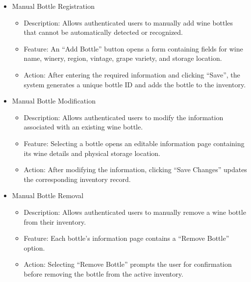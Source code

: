\documentclass[conference]{IEEEtran}
\begin{document}
\begin{itemize}
    \item Manual Bottle Registration
    \begin{itemize}
        \item Description: Allows authenticated users to manually add wine bottles that cannot be automatically detected or recognized.
        \item Feature: An ``Add Bottle'' button opens a form containing fields for wine name, winery, region, vintage, grape variety, and storage location.
        \item Action: After entering the required information and clicking ``Save'', the system generates a unique bottle ID and adds the bottle to the inventory.
    \end{itemize}

    \item Manual Bottle Modification
    \begin{itemize}
        \item Description: Allows authenticated users to modify the information associated with an existing wine bottle.
        \item Feature: Selecting a bottle opens an editable information page containing its wine details and physical storage location.
        \item Action: After modifying the information, clicking ``Save Changes'' updates the corresponding inventory record.
    \end{itemize}

    \item Manual Bottle Removal
    \begin{itemize}
        \item Description: Allows authenticated users to manually remove a wine bottle from their inventory.
        \item Feature: Each bottle's information page contains a ``Remove Bottle'' option.
        \item Action: Selecting ``Remove Bottle'' prompts the user for confirmation before removing the bottle from the active inventory.
    \end{itemize}
\end{itemize}
\end{document}
